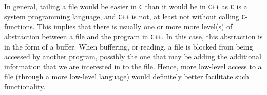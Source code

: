 In general, tailing a file would be easier in \texttt{C} than it would be in \texttt{C++} as \texttt{C} is a system programming language, and \texttt{C++} is not, at least not without calling \texttt{C}-functions. This implies that there is usually one or more more level(s) of abstraction between a file and the program in \texttt{C++}. In this case, this abstraction is in the form of a buffer. When buffering, or reading, a file is blocked from being accessed by another program, possibly the one that may be adding the additional information that we are interested in to the file. Hence, more low-level access to a file (through a more low-level language) would definitely better facilitate such functionality.
